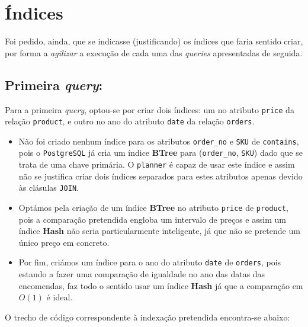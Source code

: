 \documentclass[12pt,a4paper]{article}
\begin{document}
\section*{Índices}

Foi pedido, ainda, que se indicasse (justificando) os índices que faria sentido
criar, por forma a \textit{agilizar} a execução de cada uma das \textit{queries}
apresentadas de seguida.

\subsection*{Primeira \textit{query}:}



Para a primeira \textit{query}, optou-se por criar dois índices: um no atributo
\texttt{price} da relação \texttt{product}, e outro no ano do atributo \texttt{date}
da relação \texttt{orders}.

\vspace*{0.25cm}

\begin{itemize}
  \item Não foi criado nenhum índice para os atributos \texttt{order\_no} e \texttt{SKU} de \texttt{contains}, pois o
        \texttt{PostgreSQL} já cria um índice \textbf{BTree} para (\texttt{order\_no}, \texttt{SKU}) dado que se trata
        de uma chave primária.
        O \texttt{planner} é capaz de usar este índice e assim não se justifica criar dois
        índices separados para estes atributos apenas devido às clásulas \texttt{JOIN}.

  \item Optámos pela criação de um índice \textbf{BTree} no atributo \texttt{price} de \texttt{product}, pois
        a comparação pretendida engloba um intervalo de preços e assim um índice \textbf{Hash}
        não seria particularmente inteligente, já que não se pretende um único preço
        em concreto.

  \item Por fim, criámos um índice para o ano do atributo \texttt{date} de \texttt{orders}, pois
        estando a fazer uma comparação de igualdade no ano das datas das encomendas,
        faz todo o sentido usar um índice \textbf{Hash} já que a comparação em $O(1)$ é ideal.
\end{itemize}

O trecho de código correspondente à indexação pretendida encontra-se abaixo:
\end{document}
